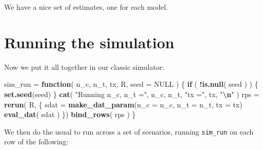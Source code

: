 \documentclass[
]{book}
\newenvironment{Shaded}{\begin{snugshade}}{\end{snugshade}}
\newcommand{\AttributeTok}[1]{\textcolor[rgb]{0.13,0.29,0.53}{#1}}
\newcommand{\ConstantTok}[1]{\textcolor[rgb]{0.56,0.35,0.01}{#1}}
\newcommand{\ControlFlowTok}[1]{\textcolor[rgb]{0.13,0.29,0.53}{\textbf{#1}}}
\newcommand{\DecValTok}[1]{\textcolor[rgb]{0.00,0.00,0.81}{#1}}
\newcommand{\FloatTok}[1]{\textcolor[rgb]{0.00,0.00,0.81}{#1}}
\newcommand{\FunctionTok}[1]{\textcolor[rgb]{0.13,0.29,0.53}{\textbf{#1}}}
\newcommand{\NormalTok}[1]{#1}
\newcommand{\OtherTok}[1]{\textcolor[rgb]{0.56,0.35,0.01}{#1}}
\newcommand{\SpecialCharTok}[1]{\textcolor[rgb]{0.81,0.36,0.00}{\textbf{#1}}}
\newcommand{\StringTok}[1]{\textcolor[rgb]{0.31,0.60,0.02}{#1}}
\begin{document}
We have a nice set of estimates, one for each model.

\section{Running the simulation}\label{running-the-simulation-1}

Now we put it all together in our classic simulator:

\begin{Shaded}
\begin{Highlighting}[]
\NormalTok{sim\_run }\OtherTok{=} \ControlFlowTok{function}\NormalTok{( n\_c, n\_t, tx, R, }\AttributeTok{seed =} \ConstantTok{NULL}\NormalTok{ ) \{}
    \ControlFlowTok{if}\NormalTok{ ( }\SpecialCharTok{!}\FunctionTok{is.null}\NormalTok{( seed ) ) \{}
        \FunctionTok{set.seed}\NormalTok{(seed)}
\NormalTok{    \}}
    \FunctionTok{cat}\NormalTok{( }\StringTok{"Running n\_c, n\_t ="}\NormalTok{, n\_c, n\_t, }\StringTok{"tx ="}\NormalTok{, tx, }\StringTok{"}\SpecialCharTok{\textbackslash{}n}\StringTok{"}\NormalTok{ )}
\NormalTok{    rps }\OtherTok{=} \FunctionTok{rerun}\NormalTok{( R, \{}
\NormalTok{        sdat }\OtherTok{=} \FunctionTok{make\_dat\_param}\NormalTok{(}\AttributeTok{n\_c =}\NormalTok{ n\_c, }\AttributeTok{n\_t =}\NormalTok{ n\_t, }\AttributeTok{tx =}\NormalTok{ tx)}
        \FunctionTok{eval\_dat}\NormalTok{( sdat )}
\NormalTok{    \})}
    \FunctionTok{bind\_rows}\NormalTok{( rps )}
\NormalTok{\}}
\end{Highlighting}
\end{Shaded}

We then do the usual to run across a set of scenarios, running \texttt{sim\_run} on each row of the following:

\begin{Shaded}
\end{Shaded}
\end{document}
